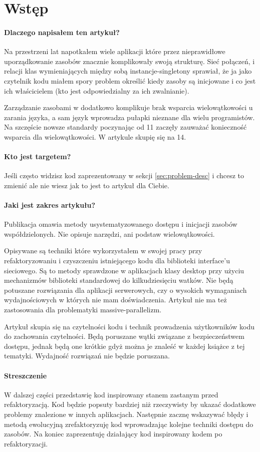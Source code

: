 \section{Wstęp}\label{sec:introduction}
\paragraph{Dlaczego napisałem ten artykuł?}
Na przestrzeni lat napotkałem wiele aplikacji które przez nieprawidłowe uporządkowanie zasobów znacznie komplikowały swoją strukturę. Sieć połączeń, i relacji klas wymieniających między sobą instancje-singletony sprawiał, że ja jako czytelnik kodu miałem spory problem określić kiedy zasoby są inicjowane i co jest ich właścicielem (kto jest odpowiedzialny za ich zwalnianie).

Zarządzanie zasobami w \Cpp{} dodatkowo komplikuje brak wsparcia wielowątkowości u zarania języka, a sam język wprowadza pułapki nieznane dla wielu programistów. Na szczęście nowsze standardy poczynając od \Cpp{}11 zaczęły zauważać konieczność wsparcia dla wielowątkowości. W artykule skupię się na \Cpp{}14.

\paragraph{Kto jest targetem?}
Jeśli często widzisz kod zaprezentowany w sekcji \ref{sec:problem-desc} i chcesz to zmienić ale nie wiesz jak to jest to artykuł dla Ciebie.

\paragraph{Jaki jest zakres artykułu?}
Publikacja omawia metody usystematyzowanego dostępu i inicjacji zasobów współdzielonych. Nie opisuje narzędzi, ani podstaw wielowątkowości.

Opisywane są techniki które wykorzystałem w swojej pracy przy refaktoryzowaniu i czyszczeniu istniejącego kodu dla biblioteki interface'u sieciowego. Są to metody sprawdzone w aplikacjach klasy desktop przy użyciu mechanizmów biblioteki standardowej do kilkudziesięciu watków. Nie będą potuszane rozwiązania dla aplikacji serwerowych, czy o wysokich wymaganiach wydajnościowych w których nie mam doświadczenia. Artykuł nie ma też zastosowania dla problematyki massive-parallelizm.

Artykuł skupia się na czytelności kodu i technik prowadzenia użytkowników kodu do zachowania czytelności. Będą poruszane wątki związane z bezpieczeństwem dostępu, jednak będą one krótkie gdyż można je znaleść w każdej książce z tej tematyki. Wydajność rozwiązań nie będzie poruszana.

\paragraph{Streszczenie}
W dalszej części przedstawię kod inspirowany stanem zastanym przed refaktoryzacją. Kod będzie popsuty bardziej niż rzeczywisty by ukazać dodatkowe problemy znalezione w innych aplikacjach. Następnie zacznę wskazywać błędy i metodą ewolucyjną zrefaktoryzuję kod wprowadzając kolejne techniki dostępu do zasobów. Na koniec zaprezentuję działający kod inspirowany kodem po refaktoryzacji.
